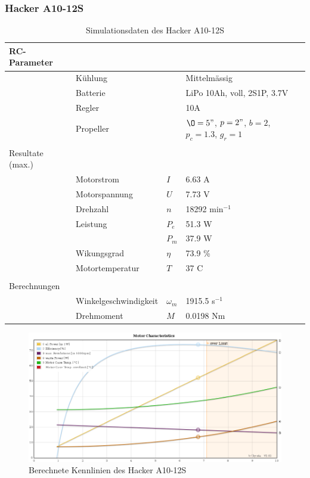\subsubsection*{Hacker A10-12S}

\begin{table}[h!]
	\centering
	\begin{tabular}{l l l l}
		RC-Parameter & & & \\ \hline
			& Kühlung	& & Mittelmässig \\
			& Batterie	& & LiPo 10Ah, voll, 2S1P, 3.7V \\
			& Regler	& & 10A \\
			& Propeller	& & $\O=5"$, $p=2"$, $b=2$, $p_c=1.3$, $g_r=1$ \\
			& & & \\
		Resultate (max.) & & & \\ \hline
			& Motorstrom	& $I$	& 6.63 A \\
			& Motorspannung	& $U$	& 7.73 V \\
			& Drehzahl	& $n$	& 18292 min$^{-1}$ \\
			& Leistung 	& $P_e$	& 51.3 W \\
			&		& $P_m$	& 37.9 W \\
			& Wikungsgrad	& $\eta$& 73.9 \% \\
			& Motortemperatur
					& $T$	& 37 C \\
			& & & \\
		Berechnungen & & & \\ \hline
			& Winkelgeschwindigkeit
					& $\omega_m$	& 1915.5 s$^{-1}$ \\
			& Drehmoment	& $M$		& 0.0198 Nm
	\end{tabular}
	\caption{Simulationsdaten des Hacker A10-12S}
\end{table}

\begin{figure}[h!]
	\centering
	\includegraphics[width=1\textwidth]{../../fig/motor/ecalc_A10-12S.png}
	\caption{Berechnete Kennlinien des Hacker A10-12S}
	\label{fig:ecalc_A10-12S}
\end{figure}
